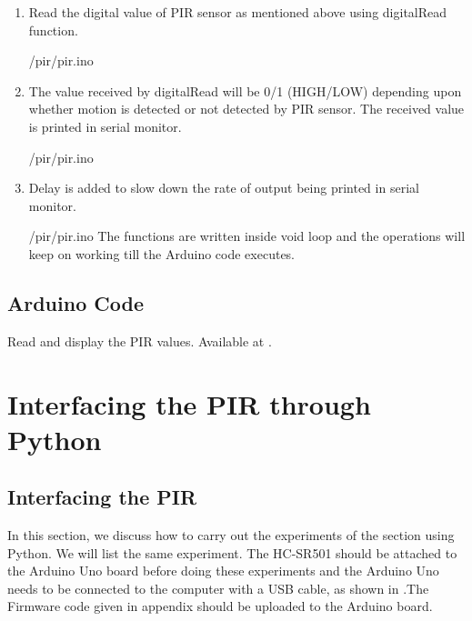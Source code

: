 \begin{enumerate}
  \item Read the digital value of PIR sensor as mentioned above using digitalRead function.
        
        {\LocLDRardcode/pir/pir.ino}
\item The value received by digitalRead will be 0/1 (HIGH/LOW) depending upon whether motion is detected or not detected by PIR sensor. The received value is printed in serial monitor.
        
        {\LocLDRardcode/pir/pir.ino}
\item Delay is added to slow down the rate of output being printed in serial monitor.
        
        {\LocLDRardcode/pir/pir.ino}
The functions are written inside void loop and the operations will keep on working till the Arduino code executes.    

\end{enumerate}


\subsection{Arduino Code}
\label{sec:ldr-arduino-code}

\begin{ardcode}
  {Read and display the PIR values.  Available at
    .}
  \label{ard:ldr-read}
  
\end{ardcode}





\section{Interfacing the PIR through Python}
\subsection{Interfacing the PIR}
In this section, we discuss how to carry out the experiments of the section  using Python. We will list the same experiment. The HC-SR501 should be attached to the Arduino Uno board before doing these experiments and the Arduino Uno needs to be connected to the computer with a USB cable, as shown in  .The Firmware code given in appendix should be uploaded to the Arduino board. 


